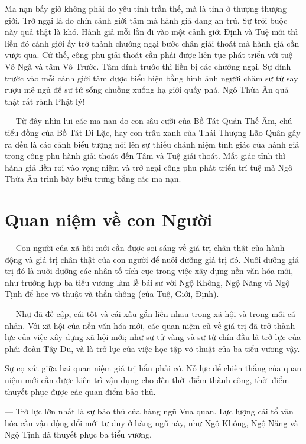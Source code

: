 Ma nạn bấy giờ không phải do yêu tinh trần thế, mà là tinh ở thượng thượng giới. Trở ngại là do chín cảnh giới tâm mà hành giả đang an trú. Sự trói buộc này quả thật là khó. Hành giả mỗi lần đi vào một cảnh giới Định và Tuệ mới thì liền đó cảnh giới ấy trở thành chướng ngại bước chân giải thoát mà hành giả cần vượt qua. Cứ thế, công phu giải thoát cần phải được liên tục phát triển với tuệ Vô Ngã và tâm Vô Trước. Tâm dính trước thì liền bị các chướng ngại. Sự dính trước vào mỗi cảnh giới tâm được biểu hiện bằng hình ảnh người chăm sư tử say rượu mê ngủ để sư tử sổng chuồng xuống hạ giới quấy phá. Ngô Thừa Ân quả thật rất rành Phật lý!

--- Từ đây nhìn lui các ma nạn do con sâu cưỡi của Bồ Tát Quán Thế Âm, chú tiểu đồng của Bồ Tát Di Lặc, hay con trâu xanh của Thái Thượng Lão Quân gây ra đều là các cảnh biểu tượng nói lên sự thiếu chánh niệm tỉnh giác của hành giả trong công phu hành giải thoát đến Tâm và Tuệ giải thoát. Mất giác tỉnh thì hành giả liền rơi vào vọng niệm và trở ngại công phu phát triển trí tuệ mà Ngô Thừa Ân trình bày biểu trưng bằng các ma nạn.

\section{Quan niệm về con Người} %
\label{sec:88_89_90_con_nguoi}

--- Con người của xã hội mới cần được soi sáng về giá trị chân thật của hành động và giá trị chân thật của con người để nuôi dưỡng giá trị đó. Nuôi dưỡng giá trị đó là nuôi dưỡng các nhân tố tích cực trong việc xây dựng nền văn hóa mới, như trường hợp ba tiểu vương làm lễ bái sư với Ngộ Không, Ngộ Năng và Ngộ Tịnh để học võ thuật và thần thông (của Tuệ, Giới, Định).

--- Như đã đề cập, cái tốt và cái xấu gắn liền nhau trong xã hội và trong mỗi cá nhân. Với xã hội của nền văn hóa mới, các quan niệm cũ về giá trị đã trở thành lực của việc xây dựng xã hội mới; như sư tử vàng và sư tử chín đầu là trở lực của phái đoàn Tây Du, và là trở lực của việc học tập võ thuật của ba tiểu vương vậy.

Sự cọ xát giữa hai quan niệm giá trị hẳn phải có. Nỗ lực để chiến thắng của quan niệm mới cần được kiên trì vận dụng cho đến thời điểm thành công, thời điểm thuyết phục được các quan điểm bảo thủ.

--- Trở lực lớn nhất là sự bảo thủ của hàng ngũ Vua quan. Lực lượng cải tổ văn hóa cần vận động đổi mới tư duy ở hàng ngũ này, như Ngộ Không, Ngộ Năng và Ngộ Tịnh đã thuyết phục ba tiểu vương.

